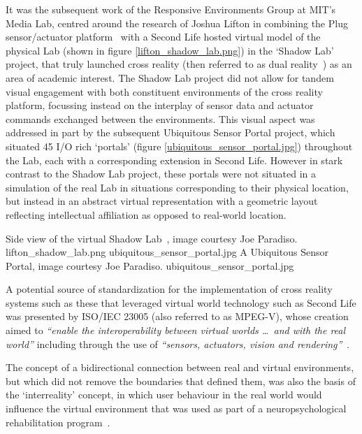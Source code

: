 It was the subsequent work of the Responsive Environments Group at MIT's Media Lab, centred around the research of Joshua Lifton in combining the Plug sensor/actuator platform~\cite{Lifton2007b} with a Second Life hosted virtual model of the physical Lab (shown in figure \ref{lifton_shadow_lab.png}) in the `Shadow Lab' project, that truly launched cross reality (then referred to as dual reality~\cite{lifton:adoption}) as an area of academic interest. The Shadow Lab project did not allow for tandem visual engagement with both constituent environments of the cross reality platform, focussing instead on the interplay of sensor data and actuator commands exchanged between the environments. This visual aspect was addressed in part by the subsequent Ubiquitous Sensor Portal project, which situated 45 I/O rich `portals' (figure \ref{ubiquitous_sensor_portal.jpg}) throughout the Lab, each with a corresponding extension in Second Life. However in stark contrast to the Shadow Lab project, these portals were not situated in a simulation of the real Lab in situations corresponding to their physical location, but instead in an abstract virtual representation with a geometric layout reflecting intellectual affiliation as opposed to real-world location.

 {Side view of the virtual Shadow Lab~\cite{Lifton2007a}, image courtesy Joe Paradiso.} {lifton_shadow_lab.png}
       {ubiquitous_sensor_portal.jpg} {A Ubiquitous Sensor Portal\protect\footnotemark , image courtesy Joe Paradiso.} {ubiquitous_sensor_portal.jpg}


A potential source of standardization for the implementation of cross reality systems such as these that leveraged virtual world technology such as Second Life was presented by ISO/IEC 23005 (also referred to as MPEG-V), whose creation aimed to \textit{``enable the interoperability between virtual worlds \ldots\ and with the real world''} including through the use of \textit{``sensors, actuators, vision and rendering''}~\cite{InternationalOrganizationforStandardization2011}.

The concept of a bidirectional connection between real and virtual environments, but which did not remove the boundaries that defined them, was also the basis of the `interreality' concept, in which user behaviour in the real world would influence the virtual environment that was used as part of a neuropsychological rehabilitation program~\cite{Giuseppe2014a}.

